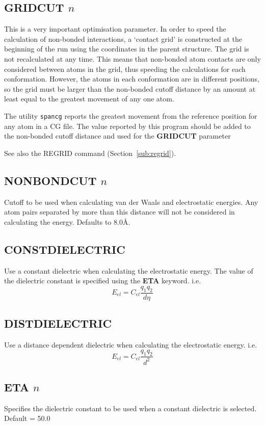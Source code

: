 \documentclass[12pt]{article}
\begin{document}
\subsection{GRIDCUT $n$}
\label{sub:gridcut}
This is a very important optimisation parameter. In order to speed the
calculation of non-bonded interactions, a `contact grid' is
constructed at the beginning of the run using the coordinates in the
parent structure. The grid is not recalculated at any time. This means
that non-bonded atom contacts are only considered between atoms in the
grid, thus speeding the calculations for each conformation. However,
the atoms in each conformation are in different positions, so the grid
must be larger than the non-bonded cutoff distance by an amount at
least equal to the greatest movement of any one atom. 

The utility {\tt spancg} reports the greatest movement from the reference
position for any atom in a CG file. The value reported by this program
should be added to the non-bonded cutoff distance and used for the
{\bf GRIDCUT} parameter

See also the REGRID command (Section~\ref{sub:regrid}).

\subsection{NONBONDCUT $n$}
Cutoff to be used when calculating van der Waals and electrostatic
energies. Any atom pairs separated by more than this distance will not
be considered in calculating the energy. Defaults to 8.0\AA.

\subsection{CONSTDIELECTRIC}
Use a constant dielectric when calculating the electrostatic energy. 
The value of the dielectric constant is specified using the 
{\bf ETA} keyword. i.e. $$ E_{el} = C_{el}\frac{q_1 q_2}{d\eta} $$

\subsection{DISTDIELECTRIC}
Use a distance dependent dielectric when calculating the electrostatic
energy. i.e. $$ E_{el} = C_{el}\frac{q_1 q_2}{d^2} $$

\subsection{ETA $n$}
Specifies the dielectric constant to be used when a constant
dielectric is selected. Default = 50.0
\end{document}
